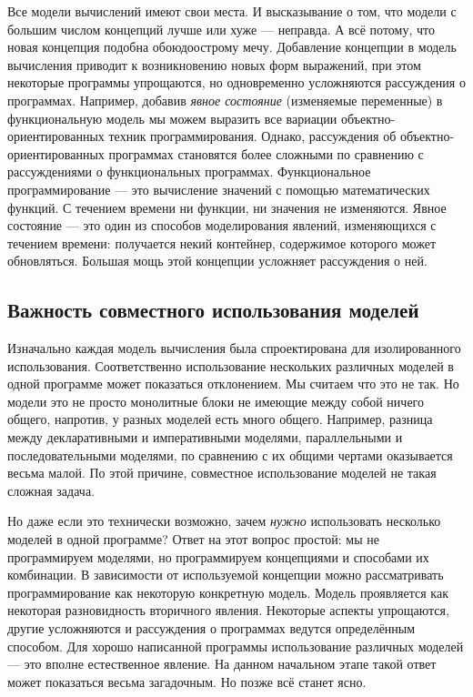 Все модели вычислений имеют свои места. И высказывание о том, что модели с большим числом концепций лучше или хуже --- неправда. А всё потому, что новая концепция подобна обоюдоострому мечу. Добавление концепции в модель вычисления приводит к возникновению новых форм выражений, при этом некоторые программы упрощаются, но одновременно усложняются рассуждения о программах. Например, добавив \emph{явное состояние} (изменяемые переменные) в функциональную модель мы можем выразить все вариации объектно-ориентированных техник программирования. Однако, рассуждения об объектно-ориентированных программах становятся более сложными по сравнению с рассуждениями о функциональных программах. Функциональное программирование --- это вычисление значений с помощью математических функций. С течением времени ни функции, ни значения не изменяются. Явное состояние --- это один из способов моделирования явлений, изменяющихся с течением времени: получается некий контейнер, содержимое которого может обновляться. Большая мощь этой концепции усложняет рассуждения о ней.

\subsection*{Важность совместного использования моделей}

Изначально каждая модель вычисления была спроектирована для изолированного использования. Соответственно использование нескольких различных моделей в одной программе может показаться отклонением. Мы считаем что это не так. Но модели это не просто монолитные блоки не имеющие между собой ничего общего, напротив, у разных моделей есть много общего. Например, разница между декларативными и императивными моделями, параллельными и последовательными моделями, по сравнению с их общими чертами оказывается весьма малой. По этой причине, совместное использование моделей не такая сложная задача.

Но даже если это технически возможно, зачем \emph{нужно} использовать несколько моделей в одной программе? Ответ на этот вопрос простой: мы не программируем моделями, но программируем концепциями и способами их комбинации. В зависимости от используемой концепции можно рассматривать программирование как некоторую конкретную модель. Модель проявляется как некоторая разновидность вторичного явления. Некоторые аспекты упрощаются, другие усложняются и рассуждения о программах ведутся определённым способом. Для хорошо написанной программы использование различных моделей --- это вполне естественное явление. На данном начальном этапе такой ответ может показаться весьма загадочным. Но позже всё станет ясно.

